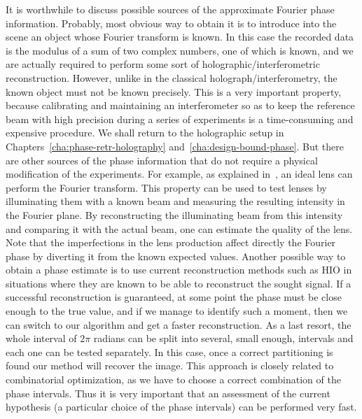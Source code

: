 It is worthwhile to discuss possible sources of the approximate
Fourier phase information. Probably, most obvious way to obtain it is
to introduce into the scene an object whose Fourier transform is
known. In this case the recorded data is the modulus of a sum of two
complex numbers, one of which is known, and we are actually required
to perform some sort of holographic/interferometric
reconstruction. However, unlike in the classical
holograph/interferometry, the known object must not be known
precisely. This is a very important property, because calibrating and
maintaining an interferometer so as to keep the reference beam with
high precision during a series of experiments is a time-consuming and
expensive procedure. We shall return to the holographic setup in
Chapters~\ref{cha:phase-retr-holography}
and~\ref{cha:design-bound-phase}.
But there are other sources
of the phase information that do not require a physical modification
of the experiments. For example, as explained
in~, an ideal lens can perform the
Fourier transform. This property can be used to test lenses by
illuminating them with a known beam and measuring the resulting
intensity in the Fourier plane. By reconstructing the illuminating
beam from this intensity and comparing it with the actual beam, one
can estimate the quality of the lens. Note that the imperfections in
the lens production affect directly the Fourier phase by diverting it
from the known expected values. Another possible way to obtain a phase
estimate is to use current reconstruction methods such as HIO in 
situations where they are known to be able to reconstruct the sought
signal. If a successful reconstruction is guaranteed, at some point
the phase must be close enough to the true value, and if we manage to
identify such a moment, then we can switch to our algorithm and get a faster
reconstruction. As a last resort, the whole interval of $2\pi$ radians
can be split into several, small enough, intervals and each one can be
tested separately. In this case, once a correct partitioning is found
our method will recover the image. This approach is closely related to
combinatorial optimization, as we have to choose a correct combination
of the phase intervals. Thus it is very important that an assessment
of the current hypothesis (a particular choice of the phase intervals)
can be performed very fast.

